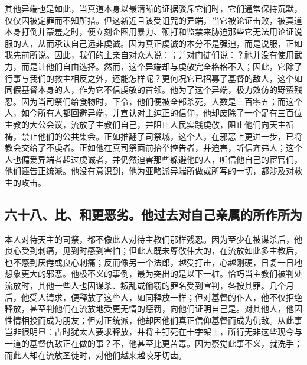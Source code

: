 其他异端也是如此，当真道本身以最清晰的证据驳斥它们时，它们通常保持沉默，仅仅因被定罪而不知所措。但这新近且该受诅咒的异端，当它被论证击败，被真道本身打倒并蒙羞之时，便立刻企图用暴力、鞭打和监禁来胁迫那些它无法用论证说服的人，从而承认自己远非虔诚。因为真正虔诚的本分不是强迫，而是说服，正如我先前所说。因此，我们的主亲自对众人说：；并对门徒们说：？祂并没有使用武力，而是让他们自由选择。然而，这个异端却与虔敬完全格格不入；因此，它除了行事与我们的救主相反之外，还能怎样呢？更何况它已招募了基督的敌人，这个如同假基督本身的人，作为它不信虔敬的首领。他为了这个异端，极力效仿的野蛮残忍。因为当司祭们给食物时，下令，他们便被全部杀死，人数是三百零五；而这个人，如今所有人都回避异端，并宣认对主纯正的信仰，他却废除了一个足有三百位主教的大公会议，流放了主教们自己，并阻止人民实践虔敬，阻止他们向天主祈祷，禁止他们的公共集会。正如推翻了司祭城，这个人，在邪恶上更进一步，已将教会交给了不虔者。正如他在真司祭面前抬举控告者，并迫害，听信齐弗人；这个人也偏爱异端者超过虔诚者，并仍然迫害那些躲避他的人，听信他自己的宦官们，他们诬告正统派。他没有意识到，他为亚略派异端所做或所写的一切，都涉及对救主的攻击。\par


\subsection{六十八、比、和更恶劣。他过去对自己亲属的所作所为}

本人对待天主的司祭，都不像此人对待主教们那样残忍。因为至少在被谋杀后，他良心受到刺痛，见到时感到害怕；但此人既未尊敬伟大的，在流放如此多主教后，也不感到厌倦或良心刺痛；反而像另一个法郎，越受打击，心越刚硬，日复一日地想象更大的邪恶。他极不义的事例，最为突出的是以下一桩。恰巧当主教们被判处流放时，其他一些人也因谋杀、叛乱或偷窃的罪名受到宣判，各按其罪。几个月后，他受人请求，便释放了这些人，如同释放一样；但对基督的仆人，他不仅拒绝释放，甚至判他们在流放地受更无情的惩罚，向他们证明自己是。对其他人，他因性情相投而成为朋友；但对正统派，他却因他们真正信仰基督而成为仇敌。从此事岂非很明显：古时犹太人要求释放，并将主钉死在十字架上，所行无非这些现今与一道的基督仇敌正在做的事？不，他甚至比更苦毒。因为察觉此事不义，就洗手；而此人却在流放圣徒时，对他们越来越咬牙切齿。\par

